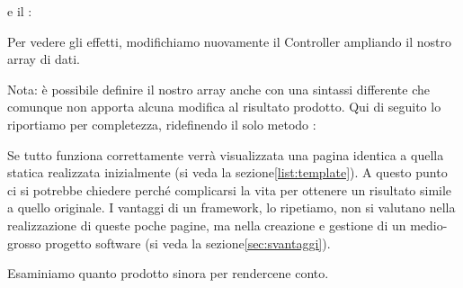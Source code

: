 e il :


Per vedere gli effetti, modifichiamo nuovamente il Controller ampliando il nostro array di dati.


Nota: è possibile definire il nostro array anche con una sintassi differente che comunque non apporta alcuna modifica al risultato prodotto. Qui di seguito lo riportiamo per completezza, ridefinendo il solo metodo :


Se tutto funziona correttamente verrà visualizzata una pagina identica a quella statica realizzata inizialmente (si veda la sezione\vref{list:template}). A questo punto ci si potrebbe chiedere perché complicarsi la vita per ottenere un risultato simile a quello originale. I vantaggi di un framework, lo ripetiamo, non si valutano nella realizzazione di queste poche pagine, ma nella creazione e gestione di un medio-grosso progetto software (si veda la sezione\vref{sec:svantaggi}).

Esaminiamo quanto prodotto sinora per rendercene conto.

